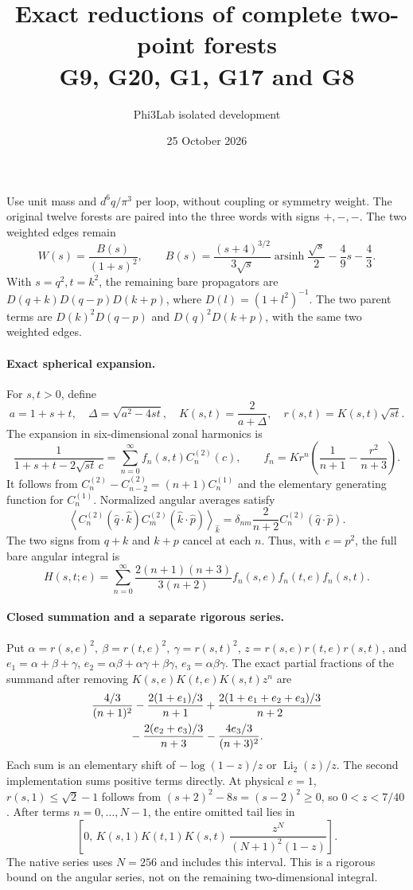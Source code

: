 \documentclass[11pt]{article}
\title{Exact reductions of complete two-point forests\\G9, G20, G1, G17 and G8}
\author{Phi3Lab isolated development}
\date{25 October 2026}
\begin{document}
\maketitle
Use unit mass and $d^6q/\pi^3$ per loop, without coupling or symmetry weight.
The original twelve forests are paired into the three words with signs
$+,-,-$. The two weighted edges remain
\[
 W(s)=\frac{B(s)}{(1+s)^2},\qquad
 B(s)=\frac{(s+4)^{3/2}}{3\sqrt s}
       \operatorname{arsinh}\frac{\sqrt s}{2}-\frac49s-\frac43.
\]
With $s=q^2,t=k^2$, the remaining bare propagators are
$D(q+k)D(q-p)D(k+p)$, where $D(l)=(1+l^2)^{-1}$.
The two parent terms are $D(k)^2D(q-p)$ and
$D(q)^2D(k+p)$, with the same two weighted edges.

\paragraph{Exact spherical expansion.}
For $s,t>0$, define
\[
 a=1+s+t,\quad \Delta=\sqrt{a^2-4st},\quad
 K(s,t)=\frac2{a+\Delta},\quad r(s,t)=K(s,t)\sqrt{st}.
\]
The expansion in six-dimensional zonal harmonics is
\[
 \frac1{1+s+t-2\sqrt{st}\,c}
 =\sum_{n=0}^\infty f_n(s,t)C_n^{(2)}(c),\qquad
 f_n=Kr^n\left(\frac1{n+1}-\frac{r^2}{n+3}\right).
\]
It follows from
$C_n^{(2)}-C_{n-2}^{(2)}=(n+1)C_n^{(1)}$
and the elementary generating function for $C_n^{(1)}$.
Normalized angular averages satisfy
\[
 \left\langle C_n^{(2)}(\widehat q\cdot\widehat k)
 C_m^{(2)}(\widehat k\cdot\widehat p)\right\rangle_{\widehat k}
 =\delta_{nm}\frac2{n+2}C_n^{(2)}(\widehat q\cdot\widehat p).
\]
The two signs from $q+k$ and $k+p$ cancel at each $n$. Thus,
with $e=p^2$, the full bare angular integral is
\[
 H(s,t;e)=\sum_{n=0}^\infty
 \frac{2(n+1)(n+3)}{3(n+2)}
 f_n(s,e)f_n(t,e)f_n(s,t).
\]

\paragraph{Closed summation and a separate rigorous series.}
Put $\alpha=r(s,e)^2,\ \beta=r(t,e)^2,\ \gamma=r(s,t)^2$,
$z=r(s,e)r(t,e)r(s,t)$, and
$e_1=\alpha+\beta+\gamma$, $e_2=\alpha\beta+\alpha\gamma+\beta\gamma$,
$e_3=\alpha\beta\gamma$.
The exact partial fractions of the summand after removing
$K(s,e)K(t,e)K(s,t)z^n$ are
\begin{align*}
 &\frac{4/3}{(n+1)^2}
 -\frac{2(1+e_1)/3}{n+1}
 +\frac{2(1+e_1+e_2+e_3)/3}{n+2}\\
 &\hspace{12mm}
 -\frac{2(e_2+e_3)/3}{n+3}
 -\frac{4e_3/3}{(n+3)^2}.
\end{align*}
Each sum is an elementary shift of
$-\log(1-z)/z$ or $\operatorname{Li}_2(z)/z$.
The second implementation sums positive terms directly.
At physical $e=1$, $r(s,1)\leq\sqrt2-1$ follows from
$(s+2)^2-8s=(s-2)^2\geq0$, so $0<z<7/40$.
After terms $n=0,\ldots,N-1$, the entire omitted tail lies in
\[
 \left[0,\,
 K(s,1)K(t,1)K(s,t)\,
 \frac{z^N}{(N+1)^2(1-z)}\right].
\]
The native series uses $N=256$ and includes this interval.
This is a rigorous bound on the angular series, not on the remaining
two-dimensional integral.
\end{document}
